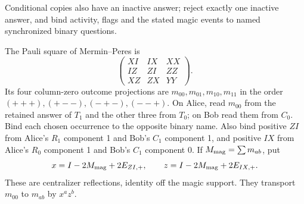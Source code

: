 Conditional copies also have an inactive answer; reject exactly one
inactive answer, and bind activity, flags and the stated magic events
to named synchronized binary questions.

The Pauli square of Mermin--Peres \cite{Mermin,Peres} is
\[
 \begin{pmatrix}XI&IX&XX\\ IZ&ZI&ZZ\\ XZ&ZX&YY\end{pmatrix}.
\]
Its four column-zero outcome projections are
$m_{00},m_{01},m_{10},m_{11}$ in the order
$(+++),(+--),(-+-),(--+)$.
On Alice, read $m_{00}$ from the retained answer of $T_1$ and the
other three from $T_0$; on Bob read them from $C_0$.
Bind each chosen occurrence to the opposite binary name.
Also bind positive $ZI$ from Alice's $R_1$ component 1 and Bob's
$C_1$ component 1, and positive $IX$ from Alice's $R_0$ component 1
and Bob's $C_1$ component 0. If $M_{\rm mag}=\sum m_{ab}$, put
\[
 x=I-2M_{\rm mag}+2E_{ZI,+},\qquad
 z=I-2M_{\rm mag}+2E_{IX,+}.
\]
These are centralizer reflections, identity off the magic support.
They transport $m_{00}$ to $m_{ab}$ by $x^az^b$.

